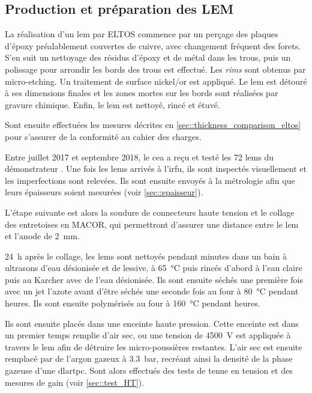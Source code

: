     \subsection{Production et préparation des LEM}
        
      La réalisation d'un \gls{lem} par ELTOS commence par un perçage des plaques d'époxy préalablement couvertes de cuivre, avec changement fréquent des forets. S'en suit un nettoyage des résidus d'époxy et de métal dans les trous, puis un polissage pour arrondir les bords des trous est effectué. Les \textit{rims} sont obtenus par micro-etching. Un traitement de surface nickel/or est appliqué. Le \gls{lem} est détouré à ses dimensions finales  et les zones mortes sur les bords sont réalisées par gravure chimique. Enfin, le \gls{lem} est nettoyé, rincé et étuvé.
          
      Sont ensuite effectuées les mesures décrites en \autoref{sec::thickness_comparison_eltos} pour s'assurer de la conformité au cahier des charges.
      
      Entre juillet 2017 et septembre 2018, le \gls{cea} a reçu et testé les 72 \glspl{lem} du démonstrateur \SSS{}. Une fois les \glspl{lem} arrivés à l'\gls{irfu}, ils sont inspectés visuellement et les imperfections sont relevées. Ils sont ensuite envoyés à la métrologie afin que leurs épaisseurs soient mesurées (voir \autoref{sec::epaisseur}).
      
      L'étape suivante est alors la soudure de connecteurs haute tension et le collage des entretoises en MACOR, qui permettront d'assurer une distance entre le \gls{lem} et l'anode de \SI{2}{\milli\meter}.
      
      \SI{24}{\hour} après le collage, les \glspl{lem} sont nettoyés pendant  minutes dans un bain à ultrasons d'eau désionisée et de lessive, à \SI{65}{\celsius} puis rincés d'abord à l'eau claire puis au Karcher avec de l'eau désionisée. Ils sont ensuite séchés une première fois avec un jet l'azote avant d'être séchés une seconde fois au four à \SI{80}{\celsius} pendant  heures. Ils sont ensuite polymérisés au four à \SI{160}{\celsius} pendant  heures.

      Ils sont ensuite placés dans une enceinte haute pression. Cette enceinte est dans un premier temps remplie d'air sec, ou une tension de \SI{4500}{\volt} est appliquée à travers le \gls{lem} afin de détruire les micro-poussières restantes. L'air sec est ensuite remplacé par de l'argon gazeux à \SI{3.3}{\bar}, recréant ainsi la densité de la phase gazeuse d'une \gls{dlartpc}. Sont alors effectués des tests de tenue en tension et des mesures de gain (voir \autoref{sec::test_HT}).
        
